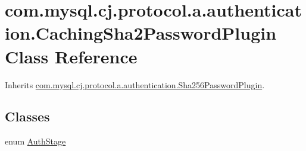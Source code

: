 \hypertarget{classcom_1_1mysql_1_1cj_1_1protocol_1_1a_1_1authentication_1_1_caching_sha2_password_plugin}{}\section{com.\+mysql.\+cj.\+protocol.\+a.\+authentication.\+Caching\+Sha2\+Password\+Plugin Class Reference}
\label{classcom_1_1mysql_1_1cj_1_1protocol_1_1a_1_1authentication_1_1_caching_sha2_password_plugin}


Inherits \mbox{\hyperlink{classcom_1_1mysql_1_1cj_1_1protocol_1_1a_1_1authentication_1_1_sha256_password_plugin}{com.\+mysql.\+cj.\+protocol.\+a.\+authentication.\+Sha256\+Password\+Plugin}}.

\subsection*{Classes}
\begin{DoxyCompactItemize}
\item 
enum \mbox{\hyperlink{enumcom_1_1mysql_1_1cj_1_1protocol_1_1a_1_1authentication_1_1_caching_sha2_password_plugin_1_1_auth_stage}{Auth\+Stage}}
\end{DoxyCompactItemize}
